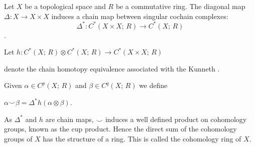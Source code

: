 \documentclass[12pt]{article}
\begin{document}
Let $X$ be a topological space and $R$ be a commutative ring.  The diagonal map $\Delta: X \to X \times X$ induces a chain map between singular cochain complexes:
$$
 \Delta^*: C^*(X \times X;\, R) \to C^*(X; \, R)  
$$. 

Let $h:C^*(X ;\, R) \otimes C^*(X ;\, R) \to C^*(X \times X;\, R )$ 

denote the chain homotopy equivalence associated with the Kunneth .    

Given $\alpha \in C^p (X ;\, R)$ and $\beta \in C^q(X ;\, R)$ we define

$
\alpha \smile \beta = \Delta^* h(\alpha \otimes \beta)
$.

As $\Delta^*$ and $h$ are chain maps, $\smile$ induces a well defined product on cohomology groups, known as the cup product.  Hence the direct sum of the cohomology groups of $X$ has the structure of a ring.  This is called the cohomology ring of $X$. 

\end{document}
